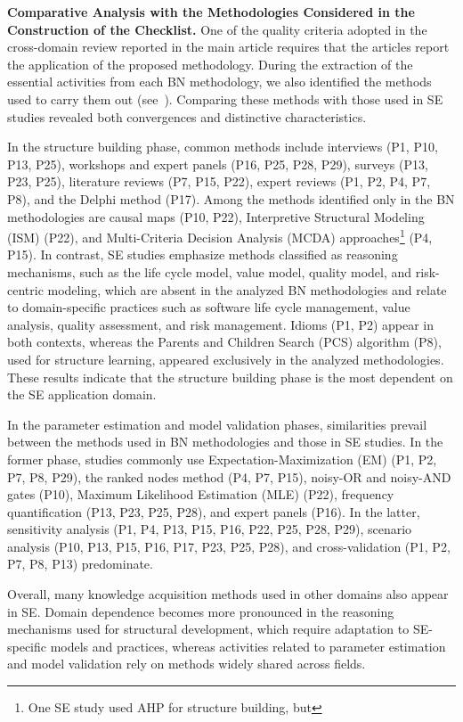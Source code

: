 \vspace*{0.5\baselineskip}

\textbf{Comparative Analysis with the Methodologies Considered in the Construction of the Checklist.} One of the quality criteria adopted in the cross-domain review reported in the main article requires that the articles report the application of the proposed methodology. During the extraction of the essential activities from each BN methodology, we also identified the methods used to carry them out (see~\cite{rique2026supplementary}). Comparing these methods with those used in SE studies revealed both convergences and distinctive characteristics.

In the structure building phase, common methods include interviews (P1, P10, P13, P25), workshops and expert panels (P16, P25, P28, P29), surveys (P13, P23, P25), literature reviews (P7, P15, P22), expert reviews (P1, P2, P4, P7, P8), and the Delphi method (P17). Among the methods identified only in the BN methodologies are causal maps (P10, P22), Interpretive Structural Modeling (ISM) (P22), and Multi-Criteria Decision Analysis (MCDA) approaches\footnote{One SE study used AHP for structure building, but } (P4, P15). In contrast, SE studies emphasize methods classified as reasoning mechanisms, such as the life cycle model, value model, quality model, and risk-centric modeling, which are absent in the analyzed BN methodologies and relate to domain-specific practices such as software life cycle management, value analysis, quality assessment, and risk management. Idioms (P1, P2) appear in both contexts, whereas the Parents and Children Search (PCS) algorithm (P8), used for structure learning, appeared exclusively in the analyzed methodologies. These results indicate that the structure building phase is the most dependent on the SE application domain.

In the parameter estimation and model validation phases, similarities prevail between the methods used in BN methodologies and those in SE studies. In the former phase, studies commonly use Expectation-Maximization (EM) (P1, P2, P7, P8, P29), the ranked nodes method (P4, P7, P15), noisy-OR and noisy-AND gates (P10), Maximum Likelihood Estimation (MLE) (P22), frequency quantification (P13, P23, P25, P28), and expert panels (P16). In the latter, sensitivity analysis (P1, P4, P13, P15, P16, P22, P25, P28, P29), scenario analysis (P10, P13, P15, P16, P17, P23, P25, P28), and cross-validation (P1, P2, P7, P8, P13) predominate.

Overall, many knowledge acquisition methods used in other domains also appear in SE. Domain dependence becomes more pronounced in the reasoning mechanisms used for structural development, which require adaptation to SE-specific models and practices, whereas activities related to parameter estimation and model validation rely on methods widely shared across fields.
